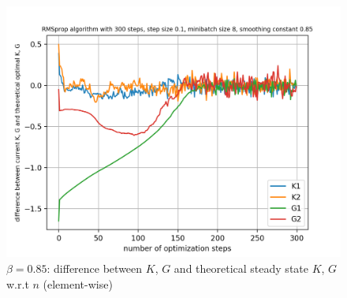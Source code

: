 \documentclass{article}
\begin{document}
\begin{figure}[h!]
\begin{minipage}[t]{.28\paperwidth}
		\includegraphics[width=1.0\textwidth]{Figures/d_beta_0_85_sep.png}
		\caption{$\beta = 0.85$: difference between $K$, $G$ and theoretical steady state $K$, $G$ w.r.t $n$ (element-wise)}
	\end{minipage}
\end{figure}
\end{document}
